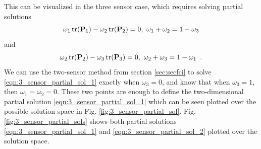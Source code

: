 This can be visualized in the three sensor case, which requires solving partial solutions
\begin{equation}
   \omega_1 \operatorname{tr}({{\mathbf{P}}}_1) - \omega_2 \operatorname{tr}({{\mathbf{P}}}_2) = 0,\ \omega_1+\omega_2=1-\omega_3 \label{eqn:3_sensor_partial_sol_1}
\end{equation}
and
\begin{equation}
   \omega_2 \tr(\mP_2) - \omega_3 \tr(\mP_3) = 0,\ \omega_2+\omega_3=1-\omega_1\enspace. \label{eqn:3_sensor_partial_sol_2}
\end{equation}
We can use the two-sensor method from section \ref{sec:secfci} to solve \eqref{eqn:3_sensor_partial_sol_1} exactly when $\omega_3=0$, and know that when $\omega_3=1$, then $\omega_1=\omega_2=0$. These two points are enough to define the two-dimensional partial solution \eqref{eqn:3_sensor_partial_sol_1} which can be seen plotted over the possible solution space in Fig. \ref{fig:3_sensor_partial_sol}. Fig. \ref{fig:3_sensor_partial_sols} shows both partial solutions \eqref{eqn:3_sensor_partial_sol_1} and \eqref{eqn:3_sensor_partial_sol_2} plotted over the solution space.
